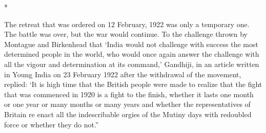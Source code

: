 \begin{center}*\end{center}



The retreat that was ordered on 12 February, 1922 was only a temporary one. The battle was over, but the war would continue. To the challenge thrown by Montague and Birkenhead that ‘India would not challenge with success the most determined people in the world, who would once again answer the challenge with all the vigour and determination at its command,’ Gandhiji, in an article written in Young India on 23 February 1922 after the withdrawal of the movement, replied: ‘It is high time that the British people were made to realize that the fight that was commenced in 1920 is a fight to the finish, whether it lasts one month or one year or many months or many years and whether the representatives of Britain re enact all the indescribable orgies of the Mutiny days with redoubled force or whether they do not.”
